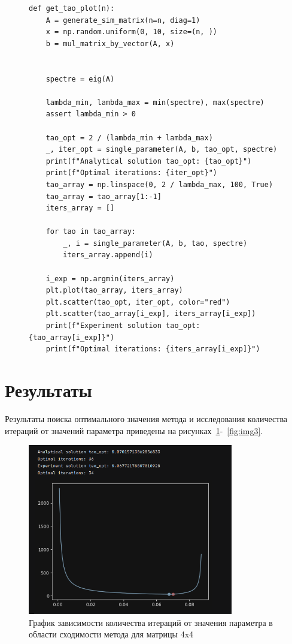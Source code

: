 \documentclass[a4paper, 14pt]{extarticle}
\begin{document}
{{{{{\begin{figure}[H]
\begin{lstlisting}[language={},caption={Получение результатов и построение графика количества итераций от значения параметра},label={lst:code2}]
def get_tao_plot(n):
    A = generate_sim_matrix(n=n, diag=1)
    x = np.random.uniform(0, 10, size=(n, ))
    b = mul_matrix_by_vector(A, x)


    spectre = eig(A)

    lambda_min, lambda_max = min(spectre), max(spectre)
    assert lambda_min > 0

    tao_opt = 2 / (lambda_min + lambda_max)
    _, iter_opt = single_parameter(A, b, tao_opt, spectre)
    print(f"Analytical solution tao_opt: {tao_opt}")
    print(f"Optimal iterations: {iter_opt}")
    tao_array = np.linspace(0, 2 / lambda_max, 100, True)
    tao_array = tao_array[1:-1]
    iters_array = []

    for tao in tao_array:
        _, i = single_parameter(A, b, tao, spectre)
        iters_array.append(i)

    i_exp = np.argmin(iters_array)
    plt.plot(tao_array, iters_array)
    plt.scatter(tao_opt, iter_opt, color="red")
    plt.scatter(tao_array[i_exp], iters_array[i_exp])
    print(f"Experiment solution tao_opt: {tao_array[i_exp]}")
    print(f"Optimal iterations: {iters_array[i_exp]}")
\end{lstlisting}
\end{figure}



\section{Результаты}

Результаты поиска оптимального значения метода и исследования количества итераций от значений параметра приведены на рисунках~\ref{fig:img1}-~\ref{fig:img3}.


\begin{figure}[H]
\centering
\includegraphics[width=0.8\textwidth]{images/res1.png}
\caption{График зависимости количества итераций от значения параметра в области сходимости метода для матрицы 4x4}
\label{fig:img1}
\end{figure}


}}}}}
\end{document}
